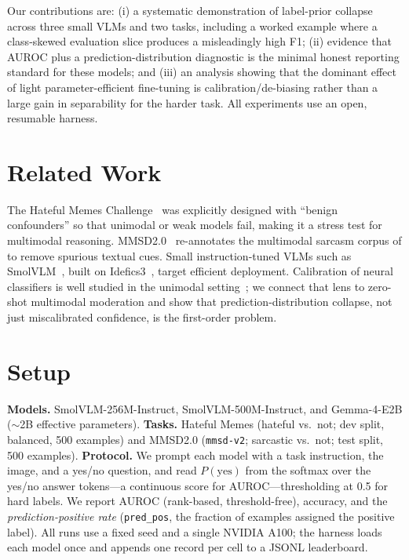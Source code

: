 \documentclass[sigconf,nonacm]{acmart}
\begin{document}
Our contributions are: (i) a systematic demonstration of label-prior collapse across
three small VLMs and two tasks, including a worked example where a class-skewed
evaluation slice produces a misleadingly high F1; (ii) evidence that AUROC plus a
prediction-distribution diagnostic is the minimal honest reporting standard for these
models; and (iii) an analysis showing that the dominant effect of light parameter-efficient
fine-tuning is calibration/de-biasing rather than a large gain in separability for the
harder task. All experiments use an open, resumable harness.

\section{Related Work}
The Hateful Memes Challenge~\cite{kiela2020hateful} was explicitly designed with
``benign confounders'' so that unimodal or weak models fail, making it a stress test for
multimodal reasoning. MMSD2.0~\cite{qin2023mmsd2} re-annotates the multimodal sarcasm
corpus of \citet{cai2019multimodal} to remove spurious textual cues. Small instruction-tuned
VLMs such as SmolVLM~\cite{marafioti2025smolvlm}, built on Idefics3~\cite{laurencon2024idefics3},
target efficient deployment. Calibration of neural classifiers is well studied in the
unimodal setting~\cite{guo2017calibration}; we connect that lens to zero-shot multimodal
moderation and show that prediction-distribution collapse, not just miscalibrated
confidence, is the first-order problem.

\section{Setup}
\textbf{Models.} SmolVLM-256M-Instruct, SmolVLM-500M-Instruct, and Gemma-4-E2B
($\sim$2B effective parameters). \textbf{Tasks.} Hateful Memes (hateful vs.\ not; dev
split, balanced, 500 examples) and MMSD2.0 (\texttt{mmsd-v2}; sarcastic vs.\ not; test
split, 500 examples). \textbf{Protocol.} We prompt each model with a task instruction,
the image, and a yes/no question, and read $P(\text{yes})$ from the softmax over the
yes/no answer tokens---a continuous score for AUROC---thresholding at 0.5 for hard
labels. We report AUROC (rank-based, threshold-free), accuracy, and the
\emph{prediction-positive rate} (\texttt{pred\_pos}, the fraction of examples assigned
the positive label). All runs use a fixed seed and a single NVIDIA A100; the harness
loads each model once and appends one record per cell to a JSONL leaderboard.
\end{document}
